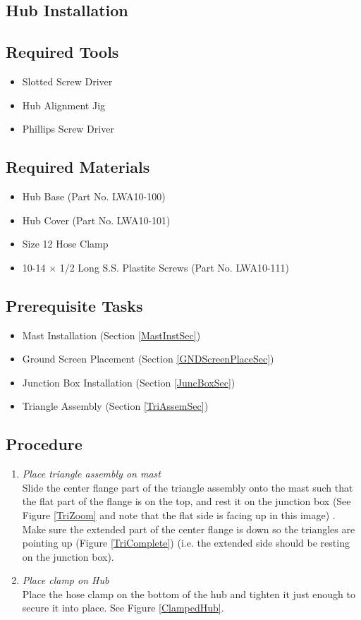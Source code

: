 \documentclass[12pt]{article}
\begin{document}
\begin{enumerate}
\section{Hub Installation} \label{HubInstSec}
	\subsection{Required Tools}
		\begin{itemize}
			\item Slotted Screw Driver
			\item Hub Alignment Jig
			\item Phillips Screw Driver
		\end{itemize}
	\subsection{Required Materials}
		\begin{itemize}
			\item Hub Base (Part No. LWA10-100)
			\item Hub Cover (Part No. LWA10-101)
			\item Size 12 Hose Clamp
			\item 10-14 $\times$ 1/2 Long S.S. Plastite Screws (Part No. LWA10-111)
		\end{itemize}
	\subsection{Prerequisite Tasks}
		\begin{itemize}
			\item Mast Installation (Section \ref{MastInstSec})
			\item Ground Screen Placement (Section \ref{GNDScreenPlaceSec})
			\item Junction Box Installation (Section \ref{JuncBoxSec})
			\item Triangle Assembly (Section \ref{TriAssemSec})
		\end{itemize}
	\subsection{Procedure}
		\begin{enumerate}
			\item \emph{Place triangle assembly on mast} \\ Slide the center flange part of the triangle assembly onto the mast such that the flat part of the flange is on the top, and rest it on the junction box (See Figure \ref{TriZoom} and note that the flat side is facing up in this image) . Make sure the extended part of the center flange is down so the triangles are pointing up (Figure \ref{TriComplete}) (i.e. the extended side should be resting on the junction box).
			\item \emph{Place clamp on Hub} \\ Place the hose clamp on the bottom of the hub and tighten it just enough to secure it into place. See Figure \ref{ClampedHub}.


\end{enumerate}
\end{enumerate}
\end{document}
